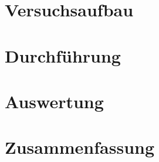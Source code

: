 \documentclass[12pt]{article}
\begin{document}
\section{Versuchsaufbau}

\section{Durchführung}

\section{Auswertung}

\section{Zusammenfassung}
\end{document}

